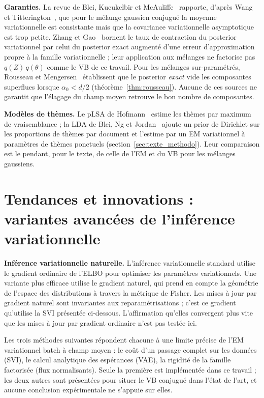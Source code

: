 \textbf{Garanties. }La revue de Blei, Kucukelbir et McAuliffe~\cite{blei2017} rapporte, d'après Wang et Titterington~\cite{wang2006,wang2005}, que pour le mélange gaussien conjugué la moyenne variationnelle est consistante mais que la covariance variationnelle asymptotique est trop petite. Zhang et Gao~\cite{zhang2020} bornent le taux de contraction du posterior variationnel par celui du posterior exact augmenté d'une erreur d'approximation propre à la famille variationnelle ; leur application aux mélanges ne factorise pas $q(Z)\,q(\theta)$ comme le VB de ce travail. Pour les mélanges sur-paramétrés, Rousseau et Mengersen~\cite{rousseau2011} établissent que le posterior \emph{exact} vide les composantes superflues lorsque $\alpha_0 < d/2$ (théorème~\ref{thm:rousseau}). Aucune de ces sources ne garantit que l'élagage du champ moyen retrouve le bon nombre de composantes.

\textbf{Modèles de thèmes. }Le pLSA de Hofmann~\cite{hofmann1999} estime les thèmes par maximum de vraisemblance ; la LDA de Blei, Ng et Jordan~\cite{blei2003} ajoute un prior de Dirichlet sur les proportions de thèmes par document et l'estime par un EM variationnel à paramètres de thèmes ponctuels (section~\ref{sec:texte_methodo}). Leur comparaison est le pendant, pour le texte, de celle de l'EM et du VB pour les mélanges gaussiens.

\section{Tendances et innovations : variantes avancées de l'inférence variationnelle}\label{sec:variantes_vb}
\textbf{Inférence variationnelle naturelle. }L'inférence variationnelle standard utilise le gradient ordinaire de l'ELBO pour optimiser les paramètres variationnels. Une variante plus efficace utilise le gradient naturel, qui prend en compte la géométrie de l'espace des distributions à travers la métrique de Fisher. Les mises à jour par gradient naturel sont invariantes aux reparamétrisations ; c'est ce gradient qu'utilise la SVI présentée ci-dessous. L'affirmation qu'elles convergent plus vite que les mises à jour par gradient ordinaire n'est pas testée ici.

Les trois méthodes suivantes répondent chacune à une limite précise de l'EM variationnel batch à champ moyen : le coût d'un passage complet sur les données (SVI), le calcul analytique des espérances (VAE), la rigidité de la famille factorisée (flux normalisants). Seule la première est implémentée dans ce travail ; les deux autres sont présentées pour situer le VB conjugué dans l'état de l'art, et aucune conclusion expérimentale ne s'appuie sur elles.

